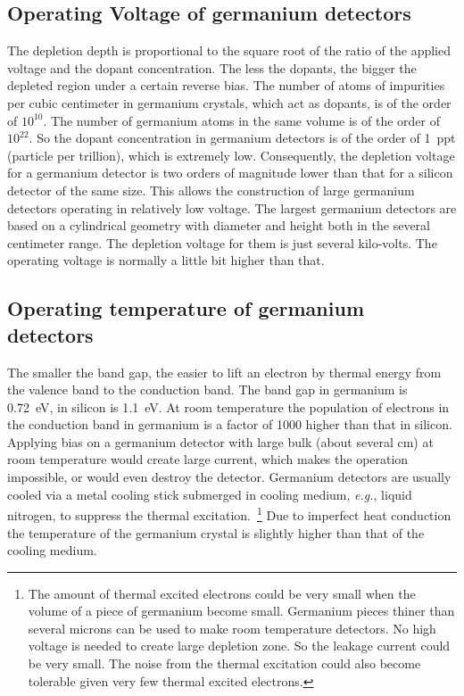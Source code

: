 \subsection{Operating Voltage of germanium detectors}
\label{sec:det:volt}
The depletion depth is proportional to the square root of the ratio of the applied voltage and the dopant concentration. The less the dopants, the bigger the depleted region under a certain reverse bias. The number of atoms of impurities per cubic centimeter in germanium crystals, which act as dopants, is of the order of $10^{10}$. The number of germanium atoms in the same volume is of the order of $10^{22}$. So the dopant concentration in germanium detectors is of the order of 1~ppt (particle per trillion), which is extremely low. Consequently, the depletion voltage for a germanium detector is two orders of magnitude lower than that for a silicon detector of the same size. This allows the construction of large germanium detectors operating in relatively low voltage. The largest germanium detectors are based on a cylindrical geometry with diameter and height both in the several centimeter range. The depletion voltage for them is just several kilo-volts. The operating voltage is normally a little bit higher than that.

\subsection{Operating temperature of germanium detectors}
\label{sec:det:temp}
The smaller the band gap, the easier to lift an electron by thermal energy from the valence band to the conduction band. The band gap in germanium is 0.72~eV, in silicon is 1.1~eV. At room temperature the population of electrons in the conduction band in germanium is a factor of 1000 higher than that in silicon. Applying bias on a germanium detector with large bulk (about several cm) at room temperature would create large current, which makes the operation impossible, or would even destroy the detector. Germanium detectors are usually cooled via a metal cooling stick submerged in cooling medium, \textit{e.g.}, liquid nitrogen, to suppress the thermal excitation.~\footnote{The amount of thermal excited electrons could be   very small when the volume of a piece of germanium become small.   Germanium pieces thiner than several microns can be used to make   room temperature detectors. No high voltage is needed to create   large depletion zone. So the leakage current could be very   small. The noise from the thermal excitation could also become   tolerable given very few thermal excited electrons.} Due to imperfect heat conduction the temperature of the germanium crystal is slightly higher than that of the cooling medium.


